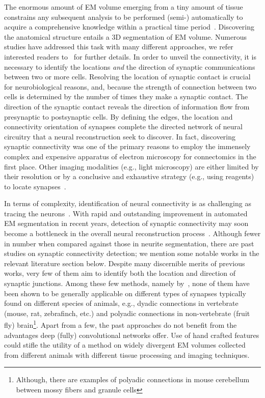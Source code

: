 \documentclass{llncs}
\begin{document}
The enormous amount of EM volume emerging from a tiny amount of tissue constrains any subsequent analysis to be performed (semi-) automatically to acquire a comprehensive knowledge within a practical time period~\cite{jain10opinion}\cite{helmstaedter15}. Discovering the anatomical structure entails a 3D segmentation of EM volume. Numerous studies have addressed this task with many different approaches, we refer interested readers to~\cite{funke17arxiv}\cite{lee17superhuman}\cite{januszewski16flood}\cite{parag2015ICCV} \cite{liu16eccv}\cite{parag14}\cite{beier2017MulticutBA} for further details. In order to unveil the connectivity, it is necessary to identify the locations \emph{and} the direction of synaptic communications between two or more cells. Resolving the location of synaptic contact is crucial for neurobiological reasons, and, because the strength of connection between two cells is determined by the number of times they make a synaptic contact. The direction of the synaptic contact reveals the direction of information flow from presynaptic to postsynaptic cells. By defining the edges, the location and connectivity orientation of synapses complete the directed network of neural circuitry that a neural reconstruction seek to discover. In fact, discovering synaptic connectivity was one of the primary reasons to employ the immensely complex and expensive apparatus of electron microscopy for connectomics in the first place. Other imaging modalities (e.g., light microscopy) are either limited by their resolution or by a conclusive and exhaustive strategy (e.g., using reagents) to locate synapses~\cite{morgan13whynot}\cite{denk12}\cite{lichtman14bigdata}. 

In terms of complexity, identification of neural connectivity is as challenging as tracing the neurons~\cite{dorkenwald17syconn}. With rapid and outstanding improvement in automated EM segmentation in recent years, detection of synaptic connectivity may soon become a bottleneck in the overall neural reconstruction process~\cite{staffler17synem}. Although fewer in number when compared against those in neurite segmentation, there are past studies on synaptic connectivity detection; we mention some notable works in the relevant literature section below. Despite many discernible merits of previous works, very few of them aim to identify both the location and direction of synaptic junctions. Among these few methods, namely by~\cite{kreshuk15miccai}\cite{dorkenwald17syconn}\cite{staffler17synem}, none of them have been shown to be generally applicable on different types of synapses typically found on different species of animals, e.g., dyadic connections in vertebrate (mouse, rat, zebrafinch, etc.) and polyadic connections in non-vertebrate (fruit fly) brain\footnote{\scriptsize Although, there are examples of polyadic connections in mouse cerebellum between mossy fibers and granule cells}. Apart from a few, the past approaches do not benefit from the advantages deep (fully) convolutional networks offer. Use of hand crafted features could stifle the utility of a method on widely divergent EM volumes collected from different animals with different tissue processing and imaging techniques. 
\end{document}

